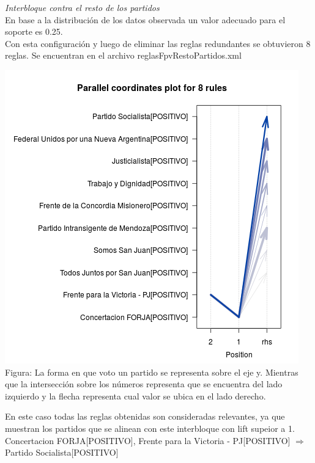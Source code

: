 \documentclass{endm}
\begin{document}
\textit{Interbloque contra el resto de los partidos} \\

En base a la distribución de los datos observada un valor adecuado para el soporte es 0.25. \\

Con esta configuración y luego de eliminar las reglas redundantes se obtuvieron 8 reglas. Se encuentran en el archivo reglasFpvRestoPartidos.xml  \\

\begin{center}
\includegraphics[scale=0.5]{graficos/paracoordFpvRestoPartidos.png} \\
\scriptsize{Figura: La forma en que voto un partido se representa sobre el eje y. Mientras que la intersección sobre  los números representa que se encuentra del lado izquierdo y la flecha representa cual valor se ubica en el lado derecho.} \\
\end{center} 

En este caso todas las reglas obtenidas son consideradas relevantes, ya que muestran los partidos que se alinean con este interbloque con lift supeior a 1. \\

{Concertacion FORJA[POSITIVO], Frente para la Victoria - PJ[POSITIVO]}  $\Longrightarrow$ {Partido Socialista[POSITIVO]} 
\\            
\end{document}
